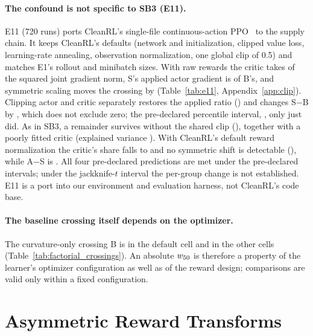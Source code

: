 \paragraph{The confound is not specific to SB3 (E11).}
E11 (720 runs) ports CleanRL's single-file continuous-action PPO~\citep{huang2022cleanrl} to the supply chain. It keeps
CleanRL's defaults (network and initialization, clipped value loss, learning-rate annealing, observation
normalization, one global clip of 0.5) and matches E1's rollout and minibatch sizes. With raw rewards the critic
takes \VelevenShareRaw{} of the squared joint gradient norm, S's applied actor gradient is \VelevenRatioRaw{} of
B's, and symmetric scaling moves the crossing by \VelevenSymRaw{} (Table~\ref{tab:e11}, Appendix~\ref{app:clip}). Clipping actor and critic
separately restores the applied ratio (\VelevenRatioGroup{}) and changes S$-$B by \VelevenGroupChange{}, which does not
exclude zero; the pre-declared percentile interval, \VelevenGroupChangePct{}, only just did. As in SB3, a remainder
survives without the shared clip (\VelevenSymGroup{}), together with a poorly fitted critic (explained variance
\VelevenEVGroup{}). With CleanRL's default reward normalization the critic's share falls to \VelevenShareDefault{}
and no symmetric shift is detectable (\VelevenSymDefault{}), while A$-$S is \VelevenAsymDefault{}. All four
pre-declared predictions are met under the pre-declared intervals; under the jackknife-$t$ interval the per-group
change is not established. E11 is a port into our environment and evaluation harness, not CleanRL's code
base.

\paragraph{The baseline crossing itself depends on the optimizer.}
The curvature-only crossing B is \VfourBaselineStd{} in the default cell and \VfourBaselineRange{} in
the other cells (Table~\ref{tab:factorial_crossings}). An absolute $w_{50}$ is therefore a property of
the learner's optimizer configuration as well as of the reward design; comparisons are valid only
within a fixed configuration.

\FloatBarrier


\FloatBarrier

\section{Asymmetric Reward Transforms}
\label{sec:asymmetric}

